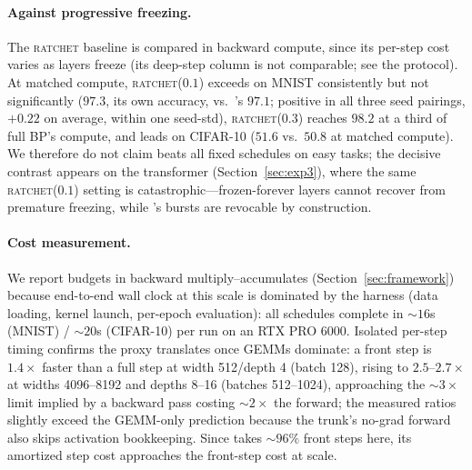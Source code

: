 \paragraph{Against progressive freezing.}
The \textsc{ratchet} baseline is compared in backward compute, since its
per-step cost varies as layers freeze (its deep-step column is not
comparable; see the protocol). At matched compute, \textsc{ratchet}($0.1$)
exceeds \fw{} on MNIST consistently but not significantly ($97.3$, its own
accuracy, vs.\ \fw{}'s $97.1$; positive in all three seed pairings, $+0.22$
on average, within one seed-std), \textsc{ratchet}($0.3$) reaches $98.2$ at
a third of full BP's compute, and \fw{} leads on CIFAR-10 ($51.6$ vs.\
$50.8$ at matched compute). We therefore do not claim \fw{} beats all fixed
schedules on easy tasks; the decisive contrast appears on the transformer
(Section~\ref{sec:exp3}), where the same \textsc{ratchet}($0.1$) setting is
catastrophic---frozen-forever layers cannot recover from premature
freezing, while \fw{}'s bursts are revocable by construction.

\paragraph{Cost measurement.} We report budgets in backward
multiply--accumulates (Section~\ref{sec:framework}) because end-to-end wall
clock at this scale is dominated by the harness (data loading, kernel
launch, per-epoch evaluation): all schedules complete in ${\sim}16$s
(MNIST) / ${\sim}20$s (CIFAR-10) per run on an RTX PRO 6000. Isolated
per-step timing confirms the proxy translates once GEMMs dominate: a front
step is $1.4\times$ faster than a full step at width 512/depth 4 (batch
128), rising to $2.5$--$2.7\times$ at widths 4096--8192 and depths 8--16
(batches 512--1024), approaching the ${\sim}3\times$ limit implied by a
backward pass costing ${\sim}2\times$ the forward; the measured ratios
slightly exceed the GEMM-only prediction because the trunk's no-grad
forward also skips activation bookkeeping. Since \fw{} takes ${\sim}96\%$
front steps here, its amortized step cost approaches the front-step cost at
scale.

